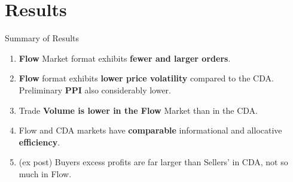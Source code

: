 \documentclass[10pt]{beamer}
\begin{document}
\section{Results}

\begin{frame}{Summary of Results}

\begin{enumerate}
    \item[R1:] \textbf{Flow} Market format exhibits \textbf{fewer and larger orders}.  \pause 
    \vspace{0.5cm}
    
    \item[R2:] \textbf{Flow} format exhibits \textbf{lower price volatility} compared to the CDA.\\  \pause 
   Preliminary \textbf{PPI} also considerably lower.
    \vspace{0.5cm}
    
    \item[R3:] Trade \textbf{Volume is lower in the Flow} Market than in the CDA.  \pause 
    \vspace{0.5cm}
    
    \item[R4:] Flow and CDA markets have \textbf{comparable} informational and allocative \textbf{efficiency}. 

    \item[R5:] (ex post) Buyers excess profits are far larger than Sellers' in CDA, not so much in Flow. 
    
\end{enumerate}



\end{frame}
\end{document}
